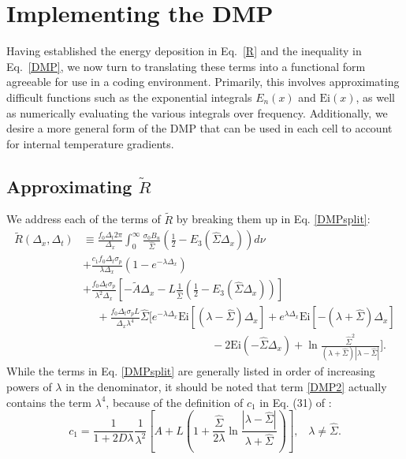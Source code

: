 \section{Implementing the DMP}
Having established the energy deposition in Eq.\ \eqref{R} and the
inequality in Eq.\ \eqref{DMP}, we now turn to translating
these terms into a functional form agreeable for use in a coding environment. 
Primarily, this involves approximating difficult functions such as the
exponential integrals $E_n(x)$ and $\mbox{Ei}(x)$, as well as numerically
evaluating
the various integrals over frequency.
Additionally, we desire a more general form of the DMP that can be
used in each cell to account for internal temperature gradients.

\subsection{Approximating $\tilde R$}
We address each of the terms of $\tilde R$ by breaking them up in Eq.
\eqref{DMPsplit}:
\begin{subequations}\label{DMPsplit}
\begin{align}
\tilde R(\Delta_x,\Delta_t)&\equiv\frac{f_0\Delta_t2\pi}{\Delta_x}
  \int_0^\infty\frac{\sigma_0B_u}{\hat\Sigma}\left(\frac{1}{2}-
    E_3(\hat\Sigma\Delta_x)\right)d\nu \label{DMP1}\\
  &+\frac{c_1f_0\Delta_t\sigma_p}{\lambda\Delta_x}(1-e^{-\lambda\Delta_x})
    \label{DMP2}\\
  &+\frac{f_0\Delta_t\sigma_p}{\lambda^2\Delta_x}\left[-\tilde A\Delta_x
    -L\frac{1}{\hat\Sigma}\left(\frac{1}{2}
    -E_3(\hat\Sigma\Delta_x)\right)\right] \label{DMP3}\\
  &\hspace{15pt}+\frac{f_0\Delta_t\sigma_pL}{\Delta_x\lambda^4}\hat\Sigma
    \bigg[e^{-\lambda\Delta_x}\mbox{Ei}[(\lambda-\hat\Sigma)\Delta_x] +
    e^{\lambda\Delta_x}\mbox{Ei}[-(\lambda+\hat\Sigma)\Delta_x] \label{DMP4} \\
  &\hspace{140pt} -2\mbox{Ei}(-\hat\Sigma\Delta_x)+ \nonumber
    \ln\frac{\hat\Sigma^2}{(\lambda+\hat\Sigma)|\lambda-\hat\Sigma|} \bigg].
\end{align}
\end{subequations}
While the terms in Eq. \eqref{DMPsplit} are generally listed in order of
increasing powers of $\lambda$ in the denominator, it should be noted that term
\eqref{DMP2} actually contains the term $\lambda^4$, because of the definition
of $c_1$ in Eq. (31) of \cite{WolLarDen}:
\[c_1=\frac{1}{1+2D\lambda}\frac{1}{\lambda^2}\left[A + 
  L\left(1+\frac{\hat\Sigma}{2\lambda}\ln\frac{|\lambda-\hat\Sigma|}{\lambda +
  \hat\Sigma} \right) \right],\hspace{10pt}\lambda\neq\hat\Sigma. \]

